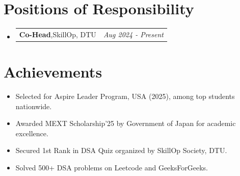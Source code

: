 \documentclass[a4paper,10pt]{article}
\makeatletter
\newcommand{\resumePOR}[3]{
\vspace{0.5mm}\item
    \begin{tabular*}{0.97\textwidth}[t]{l@{\extracolsep{\fill}}r}
        \textbf{#1},\hspace{0.3mm}#2 & \textit{\small{#3}} 
    \end{tabular*}
    \vspace{-2mm}
}
\newcommand{\resumeSubheading}[4]{
\vspace{0.5mm}\item
    \begin{tabular*}{0.98\textwidth}[t]{l@{\extracolsep{\fill}}r}
        \textbf{#1} & \textit{\footnotesize{#4}} \\
        \textit{\footnotesize{#3}} &  \footnotesize{#2}\\
    \end{tabular*}
    \vspace{-2.4mm}
}
\newcommand{\resumeSubHeadingListStart}{\begin{itemize}[leftmargin=*,labelsep=0mm]}
\newcommand{\resumeItemListStart}{\begin{justify}\begin{itemize}[leftmargin=3ex, rightmargin=2ex, noitemsep,labelsep=1.2mm,itemsep=0mm]\small}
\newcommand{\resumeSubHeadingListEnd}{\end{itemize}\vspace{2mm}}
\newcommand{\resumeItemListEnd}{\end{itemize}\end{justify}\vspace{-2mm}}
\makeatother
\begin{document}

\section{\textbf{Positions of Responsibility}}
\vspace{-0.4mm}
\resumeSubHeadingListStart

\resumePOR
{Co-Head}
{SkillOp, DTU}
{Aug 2024 - Present}

\resumeSubHeadingListEnd
\vspace{-4mm}

\section{\textbf{Achievements}}
\vspace{-0.1mm}
\resumeItemListStart
\item Selected for Aspire Leader Program, USA (2025), among top students nationwide.
\item Awarded MEXT Scholarship’25 by Government of Japan for academic excellence.
\item Secured 1st Rank in DSA Quiz organized by SkillOp Society, DTU.
\item Solved 500+ DSA problems on Leetcode and GeeksForGeeks.
\resumeItemListEnd

\end{document}
